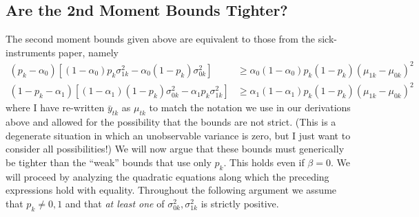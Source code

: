\documentclass[12pt]{article}
\begin{document}
\subsection*{Are the 2nd Moment Bounds Tighter?} 
The second moment bounds given above are equivalent to those from the sick-instruments paper, namely
\begin{align}
  \label{ineq:a0}
  (p_k - \alpha_0) \left[ (1 - \alpha_0)p_k \sigma^2_{1k} - \alpha_0 (1 - p_k)\sigma_{0k}^2 \right] &\geq \alpha_0 (1 - \alpha_0)p_k (1 - p_k)(\mu_{1k} - \mu_{0k})^2\\
  \label{ineq:a1}
  (1 - p_k - \alpha_1) \left[ (1 - \alpha_1)(1 - p_k) \sigma^2_{0k} - \alpha_1 p_k\sigma_{1k}^2 \right] &\geq \alpha_1 (1 - \alpha_1)p_k (1 - p_k)(\mu_{1k} - \mu_{0k})^2
\end{align}
where I have re-written $\bar{y}_{tk}$ as $\mu_{tk}$ to match the notation we use in our derivations above and allowed for the possibility that the bounds are not strict.
(This is a degenerate situation in which an unobservable variance is zero, but I just want to consider all possibilities!)
We will now argue that these bounds must generically be tighter than the ``weak'' bounds that use only $p_k$.
This holds even if $\beta = 0$.
We will proceed by analyzing the quadratic equations along which the preceding expressions hold with equality.
Throughout the following argument we assume that $p_k \neq 0,1$ and that \emph{at least one} of $\sigma^2_{0k}, \sigma^2_{1k}$ is strictly positive. 
\end{document}
